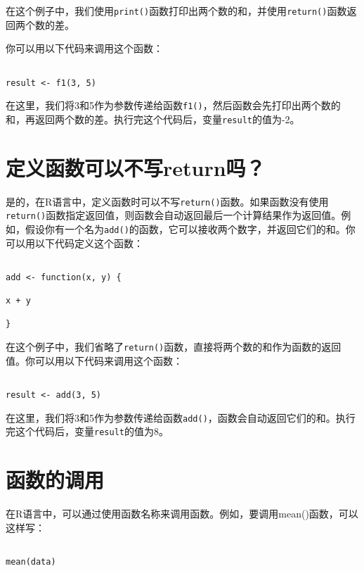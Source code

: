 \documentclass[
  letterpaper,
  DIV=11,
  numbers=noendperiod]{scrreprt}
\begin{document}
在这个例子中，我们使用\texttt{print()}函数打印出两个数的和，并使用\texttt{return()}函数返回两个数的差。

你可以用以下代码来调用这个函数：

\begin{verbatim}

result <- f1(3, 5)
\end{verbatim}

在这里，我们将3和5作为参数传递给函数\texttt{f1()}，然后函数会先打印出两个数的和，再返回两个数的差。执行完这个代码后，变量\texttt{result}的值为-2。

\hypertarget{ux5b9aux4e49ux51fdux6570ux53efux4ee5ux4e0dux5199returnux5417}{%
\section{定义函数可以不写return吗？}\label{ux5b9aux4e49ux51fdux6570ux53efux4ee5ux4e0dux5199returnux5417}}

是的，在R语言中，定义函数时可以不写\texttt{return()}函数。如果函数没有使用\texttt{return()}函数指定返回值，则函数会自动返回最后一个计算结果作为返回值。例如，假设你有一个名为\texttt{add()}的函数，它可以接收两个数字，并返回它们的和。你可以用以下代码定义这个函数：

\begin{verbatim}

add <- function(x, y) {

x + y

}
\end{verbatim}

在这个例子中，我们省略了\texttt{return()}函数，直接将两个数的和作为函数的返回值。你可以用以下代码来调用这个函数：

\begin{verbatim}

result <- add(3, 5)
\end{verbatim}

在这里，我们将3和5作为参数传递给函数\texttt{add()}，函数会自动返回它们的和。执行完这个代码后，变量\texttt{result}的值为8。

\hypertarget{ux51fdux6570ux7684ux8c03ux7528}{%
\section{函数的调用}\label{ux51fdux6570ux7684ux8c03ux7528}}

在R语言中，可以通过使用函数名称来调用函数。例如，要调用mean()函数，可以这样写：

\begin{verbatim}

mean(data)
\end{verbatim}
\end{document}
